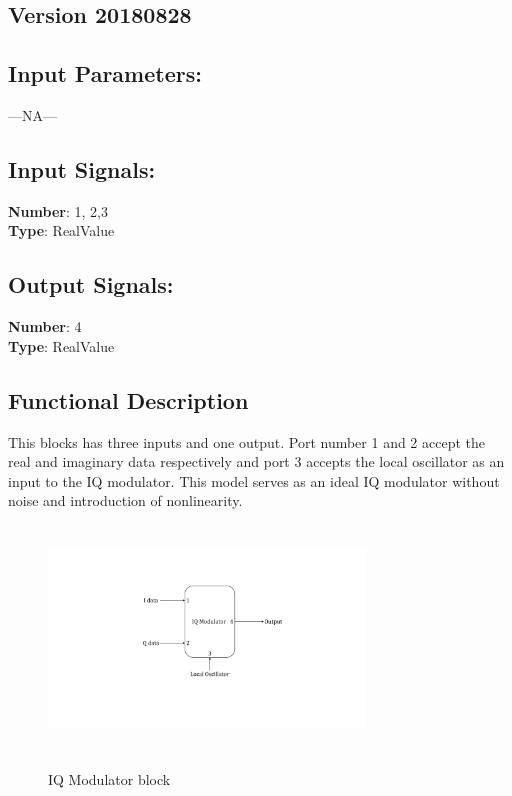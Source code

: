 \begin{refsection}
\subsection*{Version 20180828}
\subsection*{Input Parameters:}
---NA---

\subsection*{Input Signals:}
\textbf{Number}: 1, 2,3\\
\textbf{Type}: RealValue
\subsection*{Output Signals:}
\textbf{Number}: 4\\
\textbf{Type}: RealValue

\subsection*{Functional Description}
This blocks has three inputs and one output. Port number 1 and 2 accept the real and imaginary data respectively and port 3 accepts the local oscillator as an input to the IQ modulator. This model serves as an ideal IQ modulator without noise and introduction of nonlinearity.
\begin{figure}[h]
	\centering
	\includegraphics[width=0.75\textwidth, height=6cm]{./lib/iq_modulator/figures/IQ_modulator_block.pdf}
	\label{IQ_modulator_block}\caption{IQ Modulator block}
\end{figure}


\end{refsection}
